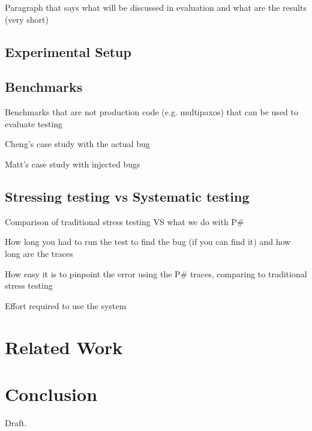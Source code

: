 \documentclass{sig-alternate}
\newcommand{\psharp}{P\#\xspace}
\begin{document}
Paragraph that says what will be discussed in evaluation and what are the results (very short)

\subsection{Experimental Setup}

\subsection{Benchmarks}

Benchmarks that are not production code (e.g. multipaxos) that can be used to evaluate testing

Cheng's case study with the actual bug

Matt's case study with injected bugs

\subsection{Stressing testing vs Systematic testing}

Comparison of traditional stress testing VS what we do with \psharp

How long you had to run the test to find the bug (if you can find it) and how long are the traces

How easy it is to pinpoint the error using the \psharp traces, comparing to traditional stress testing

Effort required to use the system

\section{Related Work}
\label{sec:rw}



\section{Conclusion}
\label{sec:concl}

Draft.


%

%
%
\end{document}
